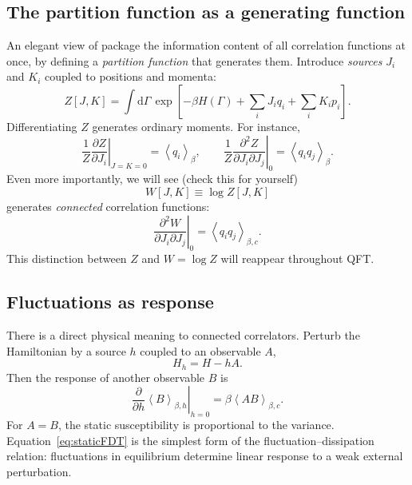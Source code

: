 \documentclass[11pt]{article}
\newcommand{\dd}{\mathrm{d}}
\newcommand{\avg}[1]{\left\langle #1\right\rangle_\beta}
\newcommand{\avgh}[1]{\left\langle #1\right\rangle_{\beta,h}}
\newcommand{\avgc}[1]{\left\langle #1\right\rangle_{\beta,c}}
\begin{document}
\subsection{The partition function as a generating function}

An elegant view of package the information content of all correlation functions at once, by defining a {\it partition function} that generates them.
Introduce {\it sources} $J_i$ and $K_i$ coupled to positions and momenta:
\begin{equation}
  Z[J,K]
  =\int \dd\Gamma\,
  \exp\left[-\beta H(\Gamma)+\sum_i J_i q_i+\sum_i K_i p_i\right].
  \label{eq:sourceZ}
\end{equation}
Differentiating $Z$ generates ordinary moments.  For instance,
\begin{equation}
  \left.\frac{1}{Z}\frac{\partial Z}{\partial J_i}\right|_{J=K=0}=\avg{q_i},
  \qquad
  \left.\frac{1}{Z}\frac{\partial^2 Z}{\partial J_i\partial J_j}\right|_{0}=\avg{q_iq_j}.
\end{equation}
Even more importantly, we will see (check this for yourself)
\begin{equation}
  W[J,K]\equiv \log Z[J,K]
\end{equation}
generates \emph{connected} correlation functions:
\begin{equation}
  \left.\frac{\partial^2 W}{\partial J_i\partial J_j}\right|_{0}
  =\avgc{q_iq_j}.
\end{equation}
This distinction between $Z$ and $W=\log Z$ will reappear throughout QFT.

\subsection{Fluctuations as response}

There is a direct physical meaning to connected correlators.  Perturb the Hamiltonian by a source $h$ coupled to an observable $A$,
\begin{equation}
  H_h=H-hA.
\end{equation}
Then the response of another observable $B$ is
\begin{equation}
  \left.\frac{\partial}{\partial h}\avgh{B}\right|_{h=0}
  =\beta\avgc{AB}.
  \label{eq:staticFDT}
\end{equation}
For $A=B$, the static susceptibility is proportional to the variance.  Equation~\eqref{eq:staticFDT} is the simplest form of the fluctuation--dissipation relation: fluctuations in equilibrium determine linear response to a weak external perturbation.
\end{document}
